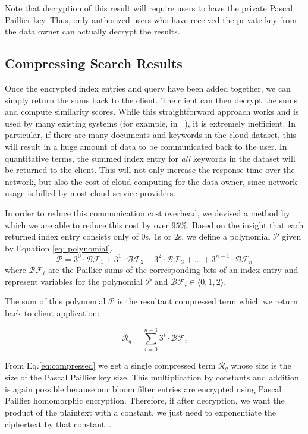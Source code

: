 Note that decryption of this result will require users to have the private Pascal 
Paillier key. Thus, only authorized users who have received the private key from the
data owner can actually decrypt the results.

\subsection{Compressing Search Results}

Once the encrypted index entries and query have been added together, 
we can simply return the sums back to the client. The client can then decrypt the
sums and compute similarity scores. While this straightforward approach works and
is used by many existing systems (for example, in ~\cite{zeehan}), it is extremely
inefficient.
In particular, if there are many documents and keywords in the cloud dataset, this
will result in a huge amount of data to be communicated back to the user. In quantitative terms,
the summed index entry for \textit{all} keywords in the dataset will be returned
to the client. This will not only increase the response time over the network, but
also the cost of cloud computing for the data owner, since network usage is billed
by most cloud service providers.

In order to reduce this communication cost overhead, we devised a method by which
we are able to reduce this cost by over $95\%$. Based on the insight that each returned
index entry consists only of $0$s, $1$s or $2$s, we
define a polynomial $\mathcal{P}$ given by Equation \ref{eq: polynomial}. 
\begin{equation}
\mathcal{P} = 3^0\cdot\mathcal{BF}_1 + 3^1\cdot\mathcal{BF}_2 +
3^2\cdot\mathcal{BF}_3 + \ldots + 3^{n-1}\cdot\mathcal{BF}_n
  \label{eq: polynomial}
\end{equation}
where $\mathcal{BF}_i$  are the Paillier sums of the corresponding bits
of an index entry and represent variables for
the polynomial $\mathcal{P}$ and $\mathcal{BF}_i \in \langle 0,1,2 \rangle $.

The sum of this polynomial $\mathcal{P}$ is the resultant compressed term which we return back
to client application:

\begin{equation}
\mathcal{R}_q = \sum_{i=0}^{n-1} 3^{i}\cdot\mathcal{BF}_i
\label{eq:compressed}
\end{equation}

From Eq.\ref{eq:compressed} we get a single compressed term $\mathcal{R}_q$ whose size is
the size of the Pascal Paillier key size. 
This multiplication by constants and addition is again possible 
because our bloom filter entries are encrypted using Pascal Paillier homomorphic
encryption. Therefore, if after decryption, we want the product of the plaintext with a constant, we
just need to exponentiate the ciphertext by that constant~\cite{pascal}.

